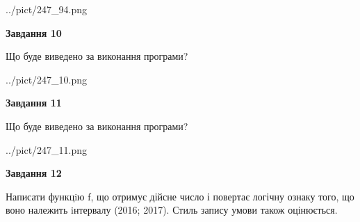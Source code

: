 \documentclass[12pt, ukrainian]{article}
\begin{document}
{\begin {large}
\begin{center}
	{../pict/247_94.png}
\end{center}
\newpage

{\begin {center}\textbf{Завдання 10}\end {center}}

Що буде виведено за виконання програми?\par
\begin{center}
	{../pict/247_10.png}
\end{center}
\newpage

{\begin {center}\textbf{Завдання 11}\end {center}}

Що буде виведено за виконання програми?\par
\begin{center}
	{../pict/247_11.png}
\end{center}
\newpage

{\begin {center}\textbf{Завдання 12}\end {center}}


Написати функцiю f, що отримує дійсне число і повертає логічну ознаку того, що воно належить iнтервалу (2016; 2017). Стиль запису умови також оцінюється.\par
\newpage

\end {large}}
\end{document}
